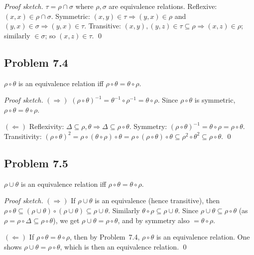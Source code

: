 \emph{Proof sketch.} $\tau=\rho\cap\sigma$ where $\rho,\sigma$ are equivalence relations.
Reflexive: $(x,x)\in\rho\cap\sigma$.
Symmetric: $(x,y)\in\tau\Rightarrow(y,x)\in\rho$ and $(y,x)\in\sigma\Rightarrow(y,x)\in\tau$.
Transitive: $(x,y),(y,z)\in\tau\subseteq\rho\Rightarrow(x,z)\in\rho$; similarly $\in\sigma$; so $(x,z)\in\tau$. \qed


\subsection*{Problem 7.4}

$\rho\circ\theta$ is an equivalence relation iff $\rho\circ\theta=\theta\circ\rho$.

\emph{Proof sketch.}
$(\Rightarrow)$ $(\rho\circ\theta)^{-1}=\theta^{-1}\circ\rho^{-1}=\theta\circ\rho$. Since $\rho\circ\theta$ is symmetric, $\rho\circ\theta=\theta\circ\rho$.

$(\Leftarrow)$ Reflexivity: $\Delta\subseteq\rho,\theta\Rightarrow\Delta\subseteq\rho\circ\theta$. Symmetry: $(\rho\circ\theta)^{-1}=\theta\circ\rho=\rho\circ\theta$. Transitivity: $(\rho\circ\theta)^2=\rho\circ(\theta\circ\rho)\circ\theta =\rho\circ(\rho\circ\theta)\circ\theta\subseteq\rho^2\circ\theta^2\subseteq\rho\circ\theta$. \qed


\subsection*{Problem 7.5}

$\rho\cup\theta$ is an equivalence relation iff $\rho\circ\theta=\theta\circ\rho$.

\emph{Proof sketch.}
$(\Rightarrow)$ If $\rho\cup\theta$ is an equivalence (hence transitive), then $\rho\circ\theta\subseteq(\rho\cup\theta)\circ(\rho\cup\theta)\subseteq\rho\cup\theta$. Similarly $\theta\circ\rho\subseteq\rho\cup\theta$. Since $\rho\cup\theta\subseteq\rho\circ\theta$ (as $\rho=\rho\circ\Delta\subseteq\rho\circ\theta$), we get $\rho\cup\theta=\rho\circ\theta$, and by symmetry also $=\theta\circ\rho$.

$(\Leftarrow)$ If $\rho\circ\theta=\theta\circ\rho$, then by Problem~7.4, $\rho\circ\theta$ is an equivalence relation. One shows $\rho\cup\theta=\rho\circ\theta$, which is then an equivalence relation. \qed
